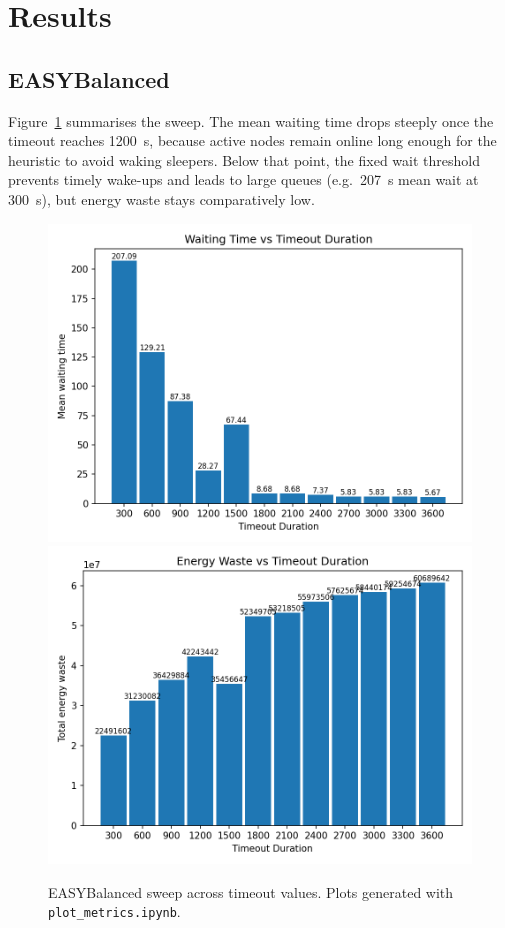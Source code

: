 \documentclass[11pt]{article}
\begin{document}
\section{Results}
\subsection{EASYBalanced}
Figure~\ref{fig:balanced-plots} summarises the sweep. The mean waiting time drops steeply once the timeout reaches \SI{1200}{\second}, because active nodes remain online long enough for the heuristic to avoid waking sleepers. Below that point, the fixed wait threshold prevents timely wake-ups and leads to large queues (e.g.\ \SI{207}{\second} mean wait at \SI{300}{\second}), but energy waste stays comparatively low.

\begin{figure}[h]
  \centering
  \includegraphics[width=\textwidth]{results/easy_balanced_run/plots/waiting_time_bar.png}\\[0.5\baselineskip]
  \includegraphics[width=\textwidth]{results/easy_balanced_run/plots/energy_waste_bar.png}
  \caption{EASYBalanced sweep across timeout values. Plots generated with \texttt{plot\_metrics.ipynb}.}
  \label{fig:balanced-plots}
\end{figure}
\end{document}
